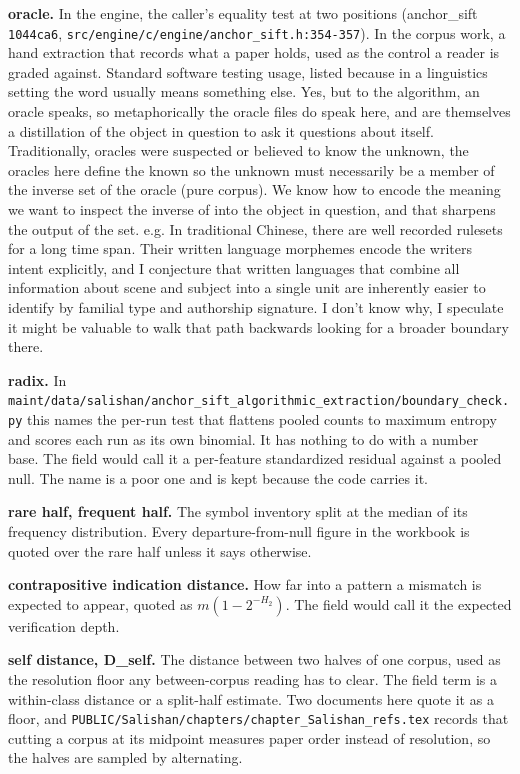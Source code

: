 \noindent\textbf{oracle.} In the engine, the caller's equality test at two positions (anchor\_sift \texttt{1044ca6}, \texttt{src/\allowbreak{}engine/\allowbreak{}c/\allowbreak{}engine/\allowbreak{}anchor\_sift.h:354-357}). In the corpus work, a hand extraction that records what a paper holds, used as the control a reader is graded against. Standard software testing usage, listed because in a linguistics setting the word usually means something else. Yes, but to the algorithm, an oracle speaks, so metaphorically the oracle files do speak here, and are themselves a distillation of the object in question to ask it questions about itself. Traditionally, oracles were suspected or believed to know the unknown, the oracles here define the known so the unknown must necessarily be a member of the inverse set of the oracle (pure corpus). We know how to encode the meaning we want to inspect the inverse of into the object in question, and that sharpens the output of the set. e.g. In traditional Chinese, there are well recorded rulesets for a long time span. Their written language morphemes encode the writers intent explicitly, and I conjecture that written languages that combine all information about scene and subject into a single unit are inherently easier to identify by familial type and authorship signature. I don't know why, I speculate it might be valuable to walk that path backwards looking for a broader boundary there.

\noindent\textbf{radix.} In \texttt{maint/\allowbreak{}data/\allowbreak{}salishan/\allowbreak{}anchor\_\allowbreak{}sift\_\allowbreak{}algorithmic\_\allowbreak{}extraction/\allowbreak{}boundary\_\allowbreak{}check.\allowbreak{}py} this names the per-run test that flattens pooled counts to maximum entropy and scores each run as its own binomial. It has nothing to do with a number base. The field would call it a per-feature standardized residual against a pooled null. The name is a poor one and is kept because the code carries it.

\noindent\textbf{rare half, frequent half.} The symbol inventory split at the median of its frequency distribution. Every departure-from-null figure in the workbook is quoted over the rare half unless it says otherwise.

\noindent\textbf{contrapositive indication distance.} How far into a pattern a mismatch is expected to appear, quoted as \(m(1-2^{-H_2})\). The field would call it the expected verification depth.

\noindent\textbf{self distance, D\_self.} The distance between two halves of one corpus, used as the resolution floor any between-corpus reading has to clear. The field term is a within-class distance or a split-half estimate. Two documents here quote it as a floor, and \texttt{PUBLIC/\allowbreak{}Salishan/\allowbreak{}chapters/\allowbreak{}chapter\_\allowbreak{}Salishan\_\allowbreak{}refs.\allowbreak{}tex} records that cutting a corpus at its midpoint measures paper order instead of resolution, so the halves are sampled by alternating.

